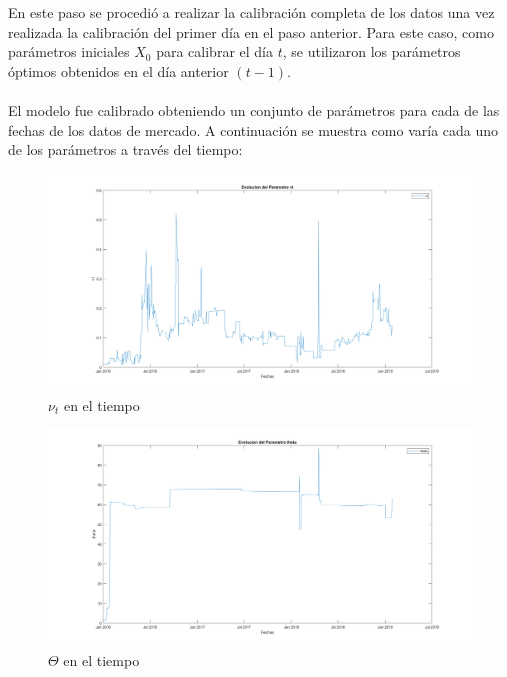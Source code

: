 \noindent En este paso se procedió a realizar la calibración completa de los datos una vez realizada la calibración del primer día en el paso anterior. Para este caso, como parámetros iniciales $X_0$ para calibrar el día $t$, se utilizaron los parámetros óptimos obtenidos en el día anterior $(t-1)$.\\\\
El modelo fue calibrado obteniendo un conjunto de parámetros para cada de las fechas de los datos de mercado. A continuación se muestra como varía cada uno de los parámetros a través del tiempo:

\begin{figure}[H]
    \begin{center}
    \includegraphics[width = 14cm]{figures/Evoluciondevt.png}
    \caption{$\nu_t$ en el tiempo}
    \label{nut} %
    \end{center}
\end{figure}
\begin{figure}[H]
    \begin{center}
    \includegraphics[width = 14cm]{figures/Evoluciondetheta.png}
    \caption{$\Theta$ en el tiempo}
    \label{theta} %
    \end{center}
\end{figure}
